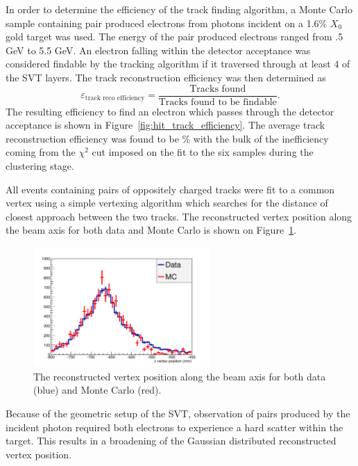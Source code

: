 
In order to determine the efficiency of the track finding algorithm, a Monte
Carlo sample containing pair produced electrons from photons incident on 
a 1.6\% $X_0$ gold target was used.  The energy of the pair produced electrons
ranged from .5 GeV to 5.5 GeV. An electron falling within the detector 
acceptance was considered findable by the tracking algorithm if it 
traversed through at least 4 of the SVT layers. The track reconstruction
efficiency was then determined as
\[
    \varepsilon_{\mbox{track reco efficiency}} = \frac{\mbox{Tracks found}}
                                            {\mbox{Tracks found to be findable}}.
\]
The resulting efficiency to find an electron which passes through the detector
acceptance is shown in Figure~\ref{fig:hit_track_efficiency}. The average track
reconstruction efficiency was found to be \% with the bulk of the inefficiency
coming from the $\chi^2$ cut imposed on the fit to the six samples during
the clustering stage.

All events containing pairs of oppositely charged tracks were fit to a
common vertex using a simple vertexing algorithm which searches for the distance
of closest approach between the two tracks.  The reconstructed vertex position
along the beam axis for both data and Monte Carlo is shown on 
Figure~\ref{fig:vz_position}.
\begin{figure}[h]
    \begin{center}
    	\includegraphics[width=0.60\textwidth]{test2012/svtperformance/trk_performance/zvertex.pdf}
        \caption{  
                    The reconstructed vertex position along the beam axis for
                    both data (blue) and Monte Carlo (red).
                } 
	\label{fig:vz_position}
    \end{center}
\end{figure}
Because of the geometric setup of the SVT, observation of pairs produced by
the incident photon required both electrons to experience a hard scatter
within the target.  This results in a broadening of the Gaussian 
distributed reconstructed vertex position. 


